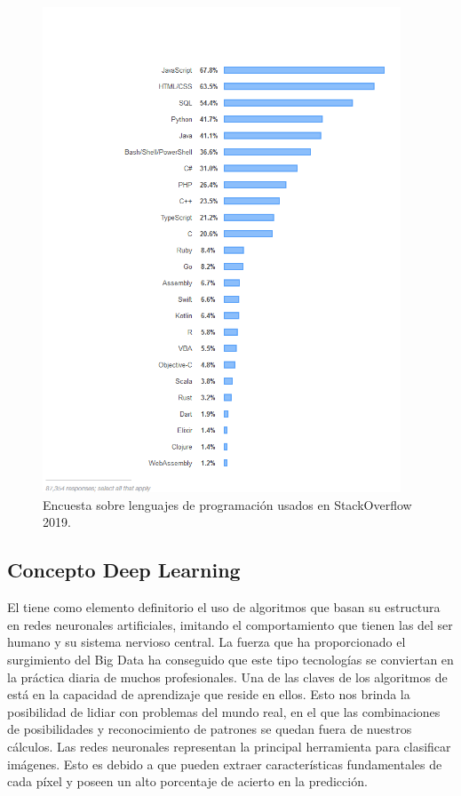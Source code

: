 \begin{figure}
    \centering
    \includegraphics[width=0.95\textwidth]{images/chapter1/stackoverflow_language.png}
    \caption{Encuesta sobre lenguajes de programación usados en StackOverflow 2019.}
    \label{fig:Encuesta_sobre_lenguajes_de_programación_en_StackOverflow_2019}
\end{figure}

\subsection{Concepto Deep Learning}\label{subsec:concepto-deep-learning}

El  tiene como elemento definitorio el uso de algoritmos que basan su estructura en redes neuronales artificiales, imitando el comportamiento que tienen las del ser humano y su sistema nervioso central.
La fuerza que ha proporcionado el surgimiento del Big Data ha conseguido que este tipo tecnologías se conviertan en la práctica diaria de muchos profesionales.
Una de las claves de los algoritmos de  está en la capacidad de aprendizaje que reside en ellos.
Esto nos brinda la posibilidad de lidiar con problemas del mundo real,
en el que las combinaciones de posibilidades y reconocimiento de patrones se quedan fuera de nuestros cálculos.
Las redes neuronales representan la principal herramienta para clasificar imágenes. Esto es debido a que pueden extraer características fundamentales de cada píxel y poseen un alto porcentaje de acierto en la predicción.



